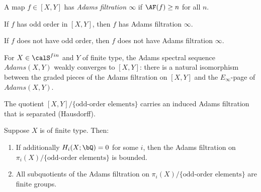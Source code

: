 \begin{definition}\label{prereq:def:adams-filtration-infinity}
    A map $f \in [X, Y]$ has \emph{Adams filtration $\infty$} if $\AF(f) \ge n$ for all $n$.
\end{definition}

\begin{axiom}\label{prereq:ax:odd-order-af-infinity}
    \leanok
    If $f$ has odd order in $[X,Y]$, then $f$ has Adams filtration $\infty$.
\end{axiom}

\begin{axiom}\label{prereq:ax:not-odd-order-af-finite}
    \leanok
    If $f$ does not have odd order, then $f$ does not have Adams filtration $\infty$.
\end{axiom}

\begin{axiom}\label{prereq:ax:adams-weak-convergence}
    \leanok
    For $X \in \calS^{fin}$ and $Y$ of finite type, the Adams spectral sequence $Adams(X,Y)$ weakly converges to $[X, Y]$: there is a natural isomorphism between the graded pieces of the Adams filtration on $[X, Y]$ and the $E_\infty$-page of $Adams(X,Y)$.
\end{axiom}

\begin{axiom}\label{prereq:ax:adams-separated}
    \leanok
    The quotient $[X, Y] / \{\text{odd-order elements}\}$ carries an induced Adams filtration that is separated (Hausdorff).
\end{axiom}

\begin{axiom}\label{prereq:ax:adams-boundedness}
    \leanok
    Suppose $X$ is of finite type. Then:
    \begin{enumerate}
        \item If additionally $H_i(X; \bQ) = 0$ for some $i$, then the Adams filtration on $\pi_i(X) / \{\text{odd-order elements}\}$ is bounded.
        \item All subquotients of the Adams filtration on $\pi_i(X) / \{\text{odd-order elements}\}$ are finite groups.
    \end{enumerate}
\end{axiom}


